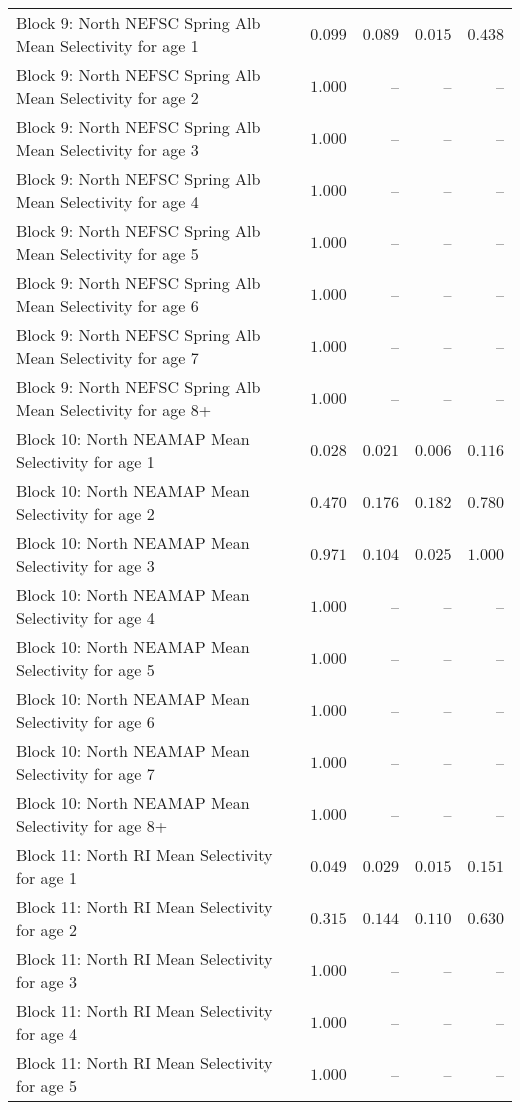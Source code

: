 \documentclass[
]{article}
\begin{document}
\begin{landscape}
\begin{longtable}[t]{lrrrr}
Block 9: North NEFSC Spring Alb Mean Selectivity for age 1 & $0.099$ & $0.089$ & $0.015$ & $0.438$\\
Block 9: North NEFSC Spring Alb Mean Selectivity for age 2 & $1.000$ & -- & -- & --\\
Block 9: North NEFSC Spring Alb Mean Selectivity for age 3 & $1.000$ & -- & -- & --\\
Block 9: North NEFSC Spring Alb Mean Selectivity for age 4 & $1.000$ & -- & -- & --\\
\addlinespace
Block 9: North NEFSC Spring Alb Mean Selectivity for age 5 & $1.000$ & -- & -- & --\\
Block 9: North NEFSC Spring Alb Mean Selectivity for age 6 & $1.000$ & -- & -- & --\\
Block 9: North NEFSC Spring Alb Mean Selectivity for age 7 & $1.000$ & -- & -- & --\\
Block 9: North NEFSC Spring Alb Mean Selectivity for age 8+ & $1.000$ & -- & -- & --\\
Block 10: North NEAMAP Mean Selectivity for age 1 & $0.028$ & $0.021$ & $0.006$ & $0.116$\\
\addlinespace
Block 10: North NEAMAP Mean Selectivity for age 2 & $0.470$ & $0.176$ & $0.182$ & $0.780$\\
Block 10: North NEAMAP Mean Selectivity for age 3 & $0.971$ & $0.104$ & $0.025$ & $1.000$\\
Block 10: North NEAMAP Mean Selectivity for age 4 & $1.000$ & -- & -- & --\\
Block 10: North NEAMAP Mean Selectivity for age 5 & $1.000$ & -- & -- & --\\
Block 10: North NEAMAP Mean Selectivity for age 6 & $1.000$ & -- & -- & --\\
\addlinespace
Block 10: North NEAMAP Mean Selectivity for age 7 & $1.000$ & -- & -- & --\\
Block 10: North NEAMAP Mean Selectivity for age 8+ & $1.000$ & -- & -- & --\\
Block 11: North RI Mean Selectivity for age 1 & $0.049$ & $0.029$ & $0.015$ & $0.151$\\
Block 11: North RI Mean Selectivity for age 2 & $0.315$ & $0.144$ & $0.110$ & $0.630$\\
Block 11: North RI Mean Selectivity for age 3 & $1.000$ & -- & -- & --\\
\addlinespace
Block 11: North RI Mean Selectivity for age 4 & $1.000$ & -- & -- & --\\
Block 11: North RI Mean Selectivity for age 5 & $1.000$ & -- & -- & --\\

\end{longtable}
\end{landscape}
\end{document}
